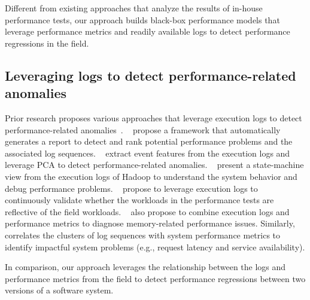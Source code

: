 Different from existing approaches that analyze the results of in-house performance tests, our approach builds black-box performance models that leverage performance metrics and readily available logs to detect performance regressions in the field.

\subsection{Leveraging logs to detect performance-related anomalies}

Prior research proposes various approaches that leverage execution logs to detect performance-related anomalies~\citep{DBLP:journals/tse/JiangH15,DBLP:conf/sosp/XuHFPJ09,DBLP:conf/icdcs/TanKGN10,DBLP:conf/sigsoft/HeLLZLZ18}. 
~\citet{DBLP:conf/icsm/JiangHHF09} propose a framework that automatically generates a report to detect and rank potential performance problems and the associated log sequences. 
~\citet{DBLP:conf/sosp/XuHFPJ09} extract event features from the execution logs and leverage PCA to detect performance-related anomalies. 
~\citet{DBLP:conf/icdcs/TanKGN10} present a state-machine view from the execution logs of Hadoop to understand the system behavior and debug performance problems. 
~\citet{DBLP:journals/ase/SyerSJH17} propose to leverage execution logs to continuously validate whether the workloads in the performance tests are reflective of the field workloads. 
~\citet{DBLP:conf/icsm/SyerJNHNF13} also propose to combine execution logs and performance metrics to diagnose memory-related performance issues. 
Similarly,~\citet{DBLP:conf/sigsoft/HeLLZLZ18} correlates the clusters of log sequences with system performance metrics to identify impactful system problems (e.g., request latency and service availability).

In comparison, our approach leverages the relationship between the logs and performance metrics from the field to detect performance regressions between two versions of a software system.

